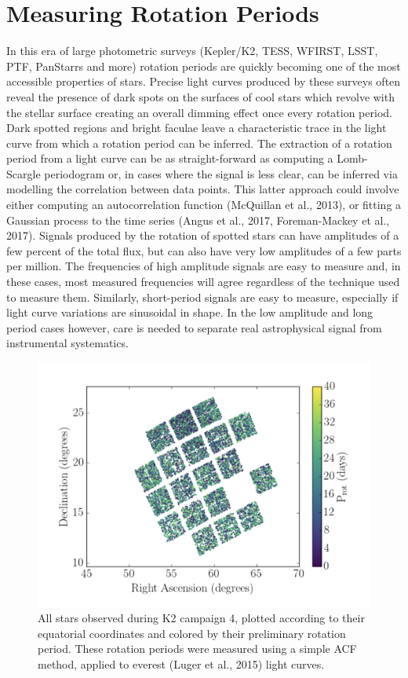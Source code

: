 \documentclass[useAMS, usenatbib, preprint, 12pt]{aastex}
\begin{document}
\section{Measuring Rotation Periods}
In this era of large photometric surveys (Kepler/K2, TESS, WFIRST, LSST, PTF,
PanStarrs and more) rotation periods are quickly becoming one of the most
accessible properties of stars.
Precise light curves produced by these surveys often reveal the presence of
dark spots on the surfaces of cool stars which revolve with the stellar
surface creating an overall dimming effect once every rotation period.
Dark spotted regions and bright faculae leave a characteristic trace in the
light curve from which a rotation period can be inferred.
The extraction of a rotation period from a light curve can be as
straight-forward as computing a Lomb-Scargle periodogram or, in cases where
the signal is less clear, can be inferred via modelling the correlation
between data points.
This latter approach could involve either computing an autocorrelation
function (McQuillan et al., 2013), or fitting a Gaussian process to the time
series (Angus et al., 2017, Foreman-Mackey et al., 2017).
Signals produced by the rotation of spotted stars can have amplitudes of a few
percent of the total flux, but can also have very low amplitudes of a few
parts per million.
The frequencies of high amplitude signals are easy to measure and, in these
cases, most measured frequencies will agree regardless of the technique used
to measure them.
Similarly, short-period signals are easy to measure, especially if light curve
variations are sinusoidal in shape.
In the low amplitude and long period cases however, care is needed to separate
real astrophysical signal from instrumental systematics.


\begin{figure}
\begin{center}
\includegraphics[width=6in, clip=true]{Kalesalad.png}
\caption{All stars observed during K2 campaign 4, plotted according to their
equatorial coordinates and colored by their preliminary rotation period.
These rotation periods were measured using a simple ACF method, applied to
    everest (Luger et al., 2015) light curves.}
\label{fig:kalesalad}
\end{center}
\end{figure}
\end{document}

